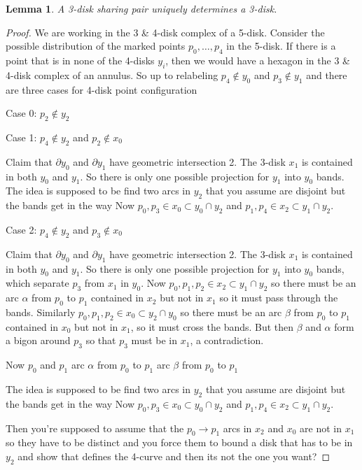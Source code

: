 \documentclass[11pt]{article}
\newtheorem{lemma}[theorem]{Lemma}
\theoremstyle{remark}
\theoremstyle{definition}
\begin{document}
\begin{lemma}
A 3-disk sharing pair uniquely determines a 3-disk.
\end{lemma}
\begin{proof}
  We are working in the 3 \& 4-disk complex of a 5-disk.
  Consider the possible distribution of the marked points
  $p_0,\ldots,p_4$
  in the 5-disk.
  If there is a point that is in none of the 4-disks $y_i$,
  then we would have a hexagon in the 3 \& 4-disk complex of an
  annulus.
  So up to relabeling
  $p_4 \not \in y_0$ and $p_3 \not \in y_1$ and there are
  three cases for 4-disk point configuration

  Case 0: $p_2 \not \in y_2$

  Case 1: $p_4 \not \in y_2$ and $p_2 \not \in x_0$



  Claim that $\partial y_0$ and $\partial y_1$ have
  geometric intersection 2.
  The 3-disk $x_1$ is contained in both $y_0$ and $y_1$.
  So there is only one possible projection for $y_1$ into $y_0$ bands.
  The idea is supposed to be find two arcs in $y_2$
  that you assume are disjoint but the bands get in the way
  Now $p_0,p_3 \in x_0 \subset y_0 \cap y_2$
  and $p_1,p_4 \in x_2 \subset y_1 \cap y_2$.


  Case 2: $p_4 \not \in y_2$ and $p_3 \not \in x_0$

  Claim that $\partial y_0$ and $\partial y_1$ have
  geometric intersection 2.
  The 3-disk $x_1$ is contained in both $y_0$ and $y_1$.
  So there is only one possible projection for $y_1$ into $y_0$ bands,
  which separate $p_3$ from $x_1$ in $y_0$.
  Now  $p_0,p_1,p_2 \in x_2 \subset y_1\cap y_2$ so there must be an arc $\alpha$
  from $p_0$ to $p_1$ contained in $x_2$ but not in $x_1$ so it must
  pass through the bands.
  Similarly $p_0,p_1,p_2 \in x_0 \subset y_2 \cap y_0$
  so there must be an arc $\beta$ from $p_0$ to $p_1$ contained in $x_0$
  but not in $x_1$, so it must cross the bands.
  But then $\beta$ and $\alpha$ form a bigon around $p_3$ so that $p_3$ must be in $x_1$, a contradiction.

  Now $p_0$ and $p_1$
  arc $\alpha$ from $p_0$ to $p_1$
  arc $\beta$ from $p_0$ to $p_1$


  The idea is supposed to be find two arcs in $y_2$
  that you assume are disjoint but the bands get in the way
  Now $p_0,p_3 \in x_0 \subset y_0 \cap y_2$
  and $p_1,p_4 \in x_2 \subset y_1 \cap y_2$.



  Then you're supposed to assume that the $p_0\to p_1$
  arcs in $x_2$ and $x_0$ are not in $x_1$ so they have to be distinct and you force
  them to bound a disk that has to be in $y_2$ and show that defines the 4-curve and
  then its not the one you want?

\end{proof}
\end{document}
